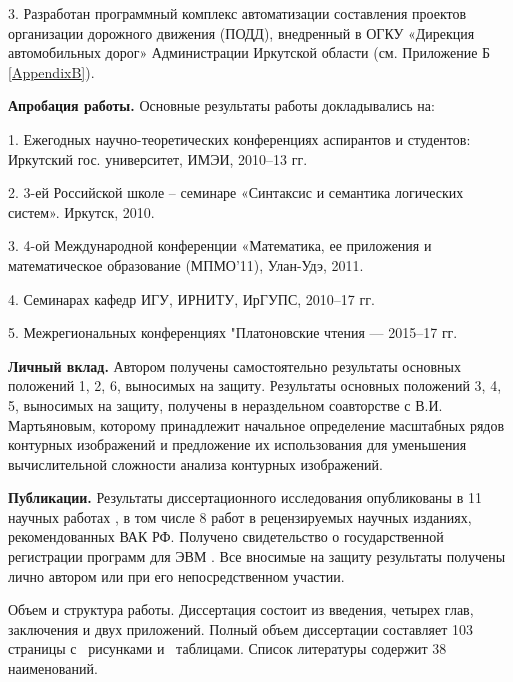 3. Разработан  программный комплекс автоматизации составления проектов организации дорожного движения (ПОДД), внедренный в ОГКУ «Дирекция автомобильных дорог» Администрации Иркутской области (см. Приложение Б \ref{AppendixB}).

\textbf{Апробация работы.} Основные результаты работы докладывались на: 


1. Ежегодных научно-теоретических конференциях аспирантов и студентов:  Иркутский  гос. университет, ИМЭИ, 2010--13 гг.

2. 3-ей Российской школе – семинаре «Синтаксис и семантика логических систем». Иркутск, 2010.

3. 4-ой Международной конференции «Математика, ее приложения и математическое образование (МПМО’11),  Улан-Удэ, 2011.

4. Семинарах кафедр ИГУ, ИРНИТУ, ИрГУПС, 2010--17 гг.

5. Межрегиональных конференциях "Платоновские чтения --- 2015--17 гг.


\textbf{Личный вклад.} Автором получены самостоятельно результаты основных положений 1, 2, 6,  выносимых  на защиту.  Результаты основных положений 3, 4, 5,  выносимых  на защиту, получены в нераздельном соавторстве с В.И. Мартьяновым, которому принадлежит начальное определение масштабных рядов контурных изображений и предложение их использования для уменьшения вычислительной сложности анализа контурных изображений.


\textbf{Публикации.} Результаты диссертационного исследования
опубликованы в 11 научных работах \cite{D5,D6,D7,D8,D15,D16,D19,D20,scaleline,overlaps,emulsion}, в том числе 8 \cite{D6,D7,D8,D15,D19,D20,scaleline,overlaps,emulsion} работ в рецензируемых научных изданиях, рекомендованных ВАК РФ. Получено свидетельство о государственной регистрации программ для ЭВМ \cite{D18}.
Все вносимые на защиту результаты получены лично автором или при его непосредственном участии.


Объем и структура работы. Диссертация состоит из введения, четырех глав, заключения и двух приложений. Полный объем диссертации составляет 103 страницы с \totalfigures\ рисунками и \totaltables\ таблицами. Список литературы содержит 38 наименований.